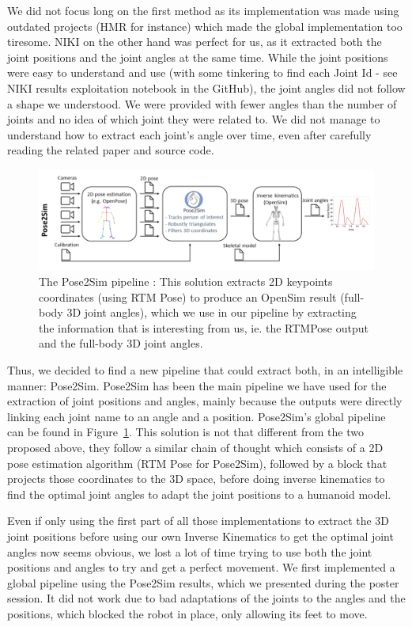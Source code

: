 \documentclass{amsart}
\theoremstyle{definition}
\theoremstyle{plain}
\begin{document}
We did not focus long on the first method as its implementation was made using outdated projects (HMR for instance) which made the global implementation too tiresome. NIKI on the other hand was perfect for us, as it extracted both the joint positions and the joint angles at the same time. While the joint positions were easy to understand and use (with some tinkering to find each Joint Id - see NIKI results exploitation notebook in the GitHub), the joint angles did not follow a shape we understood. We were provided with fewer angles than the number of joints and no idea of which joint they were related to. We did not manage to understand how to extract each joint's angle over time, even after carefully reading the related paper and source code. 

\begin{figure}
  \includegraphics[width = 0.99 \columnwidth]{img/pose2sim_pipeline.png}
  \caption{The Pose2Sim pipeline : This solution extracts 2D keypoints coordinates (using RTM Pose\cite{RTMPose}) to produce an OpenSim result (full-body 3D joint angles), which we use in our pipeline by extracting the information that is interesting from us, ie. the RTMPose output and the full-body 3D joint angles.}\label{fig:pose2sim_pipeline}
\end{figure}

Thus, we decided to find a new pipeline that could extract both, in an intelligible manner: Pose2Sim\cite{Pose2Sim}. Pose2Sim has been the main pipeline we have used for the extraction of joint positions and angles, mainly because the outputs were directly linking each joint name to an angle and a position. Pose2Sim's global pipeline can be found in Figure~\ref{fig:pose2sim_pipeline}. This solution is not that different from the two proposed above, they follow a similar chain of thought which consists of a 2D pose estimation algorithm (RTM Pose\cite{RTMPose} for Pose2Sim), followed by a block that projects those coordinates to the 3D space, before doing inverse kinematics to find the optimal joint angles to adapt the joint positions to a humanoid model. 

Even if only using the first part of all those implementations to extract the 3D joint positions before using our own Inverse Kinematics to get the optimal joint angles now seems obvious, we lost a lot of time trying to use both the joint positions and angles to try and get a perfect movement. We first implemented a global pipeline using the Pose2Sim results, which we presented during the poster session. It did not work due to bad adaptations of the joints to the angles and the positions, which blocked the robot in place, only allowing its feet to move. 
\end{document}
